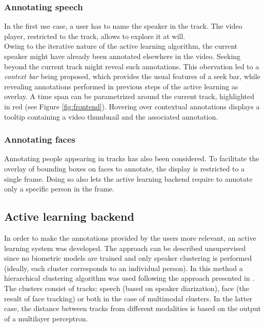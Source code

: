 \documentclass[a4paper]{article}
\begin{document}
\subsubsection{Annotating speech} \label{sec:shot}
        \vspace{-0.2cm}
In the first use case, a user has to name the speaker in the track. The video player, restricted to the track, allows to explore it at will.\\
Owing to the iterative nature of the active learning algorithm, the current speaker might have already been annotated elsewhere in the video. Seeking beyond the current track might reveal such annotations. This obervation led to a \emph{context bar} being proposed, which provides the usual features of a seek bar, while revealing annotations performed in previous steps of the active learning as overlay. A time span can be parametrized around the current track, highlighted in red (see Figure \ref{fig:frontend}). Hovering over contextual annotations displays a tooltip containing a video thumbnail and the associated annotation.\\

        \vspace{-0.5cm}
\subsubsection{Annotating faces} \label{sec:head}
        \vspace{-0.2cm}
Annotating people appearing in tracks has also been considered. To facilitate the overlay of bounding boxes on faces to annotate, the display is restricted to a single frame. Doing so also lets the active learning backend require to annotate only a specific person in the frame.


      \subsection{Active learning backend}

In order to make the annotations provided by the users more relevant, an active learning system 
was developed. The approach can be described unsupervised since no biometric models are trained and only speaker clustering is performed (ideally, each cluster corresponds to an individual person).  In this method a hierarchical clustering algorithm was used 
following the  approach presented in \cite{poignant2012unsupervised}.  The clusters consist of tracks: speech (based on speaker diarization),  face (the result of face tracking) or both in the case of multimodal clusters. In the latter case, the distance between tracks from different modalities is based on the output of a multilayer perceptron.
\end{document}
